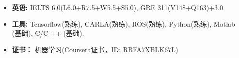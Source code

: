   \begin{itemize}[leftmargin=*]
  	\item \textbf{英语:} IELTS 6.0(L6.0+R7.5+W5.5+S5.0), GRE 311(V148+Q163)+3.0
    \item \textbf{工具:} Tensorflow(熟练), CARLA(熟练), ROS(熟练), Python(熟练), Matlab (基础), C/C ++ (基础).
    \item \textbf{证书：} 机器学习(Coursera证书，ID: RBFA7XBLK67L)
  \end{itemize}